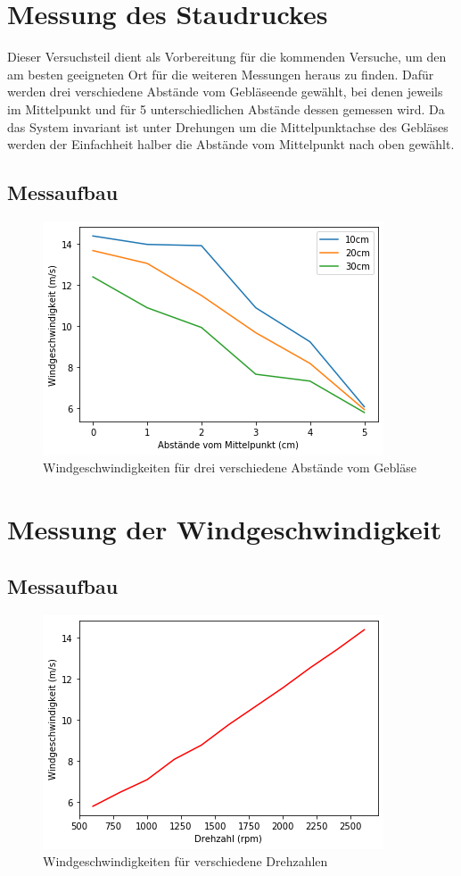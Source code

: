 \section{Messung des Staudruckes}

Dieser Versuchsteil dient als Vorbereitung für die kommenden Versuche, um den am besten geeigneten Ort für die weiteren Messungen heraus zu finden. Dafür werden drei verschiedene Abstände vom Gebläseende gewählt, bei denen jeweils im Mittelpunkt und für 5 unterschiedlichen Abstände dessen gemessen wird. Da das System invariant ist unter Drehungen um die Mittelpunktachse des Gebläses werden der Einfachheit halber die Abstände vom Mittelpunkt nach oben gewählt.
\subsection{Messaufbau}

\begin{figure}
    \centering
    \includegraphics{Aeromechanik/Protokoll/fig/Aeromechanik Versuch 1.1.png}
    \caption{Windgeschwindigkeiten für drei verschiedene Abstände vom Gebläse}
    \label{fig:Aeromechanik Versuch 1.1}
\end{figure}

\section{Messung der Windgeschwindigkeit}
\subsection{Messaufbau}

\begin{figure}
    \centering
    \includegraphics{Aeromechanik/Protokoll/fig/Aeromechanik Versuch 1.2.png}
    \caption{Windgeschwindigkeiten für verschiedene Drehzahlen}
    \label{fig:Aeromechanik Versuch 1.2}
\end{figure}